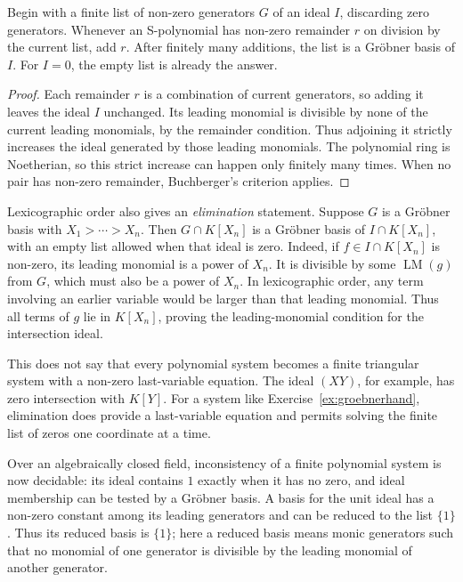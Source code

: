 \begin{corollary}\label{cor:buchalg}
Begin with a finite list of non-zero generators $G$ of an ideal $I$, discarding zero generators. Whenever an S-polynomial has non-zero remainder $r$ on division by the current list, add $r$. After finitely many additions, the list is a Gröbner basis of $I$. For $I=0$, the empty list is already the answer.
\end{corollary}

\begin{proof}
Each remainder $r$ is a combination of current generators, so adding it leaves the ideal $I$ unchanged. Its leading monomial is divisible by none of the current leading monomials, by the remainder condition. Thus adjoining it strictly increases the ideal generated by those leading monomials. The polynomial ring is Noetherian, so this strict increase can happen only finitely many times. When no pair has non-zero remainder, Buchberger's criterion applies.
\end{proof}

Lexicographic order also gives an \emph{elimination} statement. Suppose $G$ is a Gröbner basis with $X_1>\cdots>X_n$. Then $G\cap K[X_n]$ is a Gröbner basis of $I\cap K[X_n]$, with an empty list allowed when that ideal is zero. Indeed, if $f\in I\cap K[X_n]$ is non-zero, its leading monomial is a power of $X_n$. It is divisible by some $\operatorname{LM}(g)$ from $G$, which must also be a power of $X_n$. In lexicographic order, any term involving an earlier variable would be larger than that leading monomial. Thus all terms of $g$ lie in $K[X_n]$, proving the leading-monomial condition for the intersection ideal.

This does not say that every polynomial system becomes a finite triangular system with a non-zero last-variable equation. The ideal $(XY)$, for example, has zero intersection with $K[Y]$. For a system like Exercise~\ref{ex:groebnerhand}, elimination does provide a last-variable equation and permits solving the finite list of zeros one coordinate at a time.

Over an algebraically closed field, inconsistency of a finite polynomial system is now decidable: its ideal contains $1$ exactly when it has no zero, and ideal membership can be tested by a Gröbner basis. A basis for the unit ideal has a non-zero constant among its leading generators and can be reduced to the list $\{1\}$. Thus its reduced basis is $\{1\}$; here a reduced basis means monic generators such that no monomial of one generator is divisible by the leading monomial of another generator.

